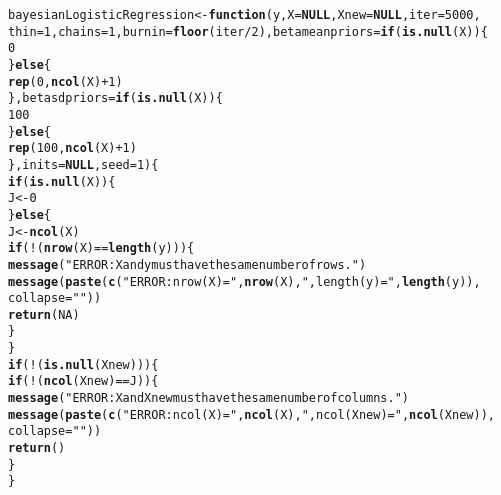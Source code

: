 \documentclass{article}\usepackage[]{graphicx}\usepackage[]{color}
\makeatletter
\newcommand{\hlnum}[1]{\textcolor[rgb]{0.686,0.059,0.569}{#1}}%
\newcommand{\hlstr}[1]{\textcolor[rgb]{0.192,0.494,0.8}{#1}}%
\newcommand{\hlopt}[1]{\textcolor[rgb]{0,0,0}{#1}}%
\newcommand{\hlstd}[1]{\textcolor[rgb]{0.345,0.345,0.345}{#1}}%
\newcommand{\hlkwa}[1]{\textcolor[rgb]{0.161,0.373,0.58}{\textbf{#1}}}%
\newcommand{\hlkwb}[1]{\textcolor[rgb]{0.69,0.353,0.396}{#1}}%
\newcommand{\hlkwc}[1]{\textcolor[rgb]{0.333,0.667,0.333}{#1}}%
\newcommand{\hlkwd}[1]{\textcolor[rgb]{0.737,0.353,0.396}{\textbf{#1}}}%
\newenvironment{kframe}{%
 \def\at@end@of@kframe{}%
 \ifinner\ifhmode%
  \def\at@end@of@kframe{\end{minipage}}%
  \begin{minipage}{\columnwidth}%
 \fi\fi%
 \def\FrameCommand##1{\hskip\@totalleftmargin \hskip-\fboxsep
 \colorbox{shadecolor}{##1}\hskip-\fboxsep
     \hskip-\linewidth \hskip-\@totalleftmargin \hskip\columnwidth}%
 \MakeFramed {\advance\hsize-\width
   \@totalleftmargin\z@ \linewidth\hsize
   \@setminipage}}%
 {\par\unskip\endMakeFramed%
 \at@end@of@kframe}
\newenvironment{knitrout}{}{} %
\makeatother
\begin{document}
\begin{knitrout}
\color{fgcolor}\begin{kframe}
\begin{alltt}
\hlstd{bayesianLogisticRegression} \hlkwb{<-} \hlkwa{function}\hlstd{(}\hlkwc{y}\hlstd{,} \hlkwc{X} \hlstd{=} \hlkwa{NULL}\hlstd{,} \hlkwc{Xnew} \hlstd{=} \hlkwa{NULL}\hlstd{,} \hlkwc{iter} \hlstd{=} \hlnum{5000}\hlstd{,}
    \hlkwc{thin} \hlstd{=} \hlnum{1}\hlstd{,} \hlkwc{chains} \hlstd{=} \hlnum{1}\hlstd{,} \hlkwc{burnin} \hlstd{=} \hlkwd{floor}\hlstd{(iter}\hlopt{/}\hlnum{2}\hlstd{),} \hlkwc{betameanpriors} \hlstd{=} \hlkwa{if} \hlstd{(}\hlkwd{is.null}\hlstd{(X)) \{}
        \hlnum{0}
    \hlstd{\}} \hlkwa{else} \hlstd{\{}
        \hlkwd{rep}\hlstd{(}\hlnum{0}\hlstd{,} \hlkwd{ncol}\hlstd{(X)} \hlopt{+} \hlnum{1}\hlstd{)}
    \hlstd{\},} \hlkwc{betasdpriors} \hlstd{=} \hlkwa{if} \hlstd{(}\hlkwd{is.null}\hlstd{(X)) \{}
        \hlnum{100}
    \hlstd{\}} \hlkwa{else} \hlstd{\{}
        \hlkwd{rep}\hlstd{(}\hlnum{100}\hlstd{,} \hlkwd{ncol}\hlstd{(X)} \hlopt{+} \hlnum{1}\hlstd{)}
    \hlstd{\},} \hlkwc{inits} \hlstd{=} \hlkwa{NULL}\hlstd{,} \hlkwc{seed} \hlstd{=} \hlnum{1}\hlstd{) \{}
    \hlkwa{if} \hlstd{(}\hlkwd{is.null}\hlstd{(X)) \{}
        \hlstd{J} \hlkwb{<-} \hlnum{0}
    \hlstd{\}} \hlkwa{else} \hlstd{\{}
        \hlstd{J} \hlkwb{<-} \hlkwd{ncol}\hlstd{(X)}
        \hlkwa{if} \hlstd{(}\hlopt{!}\hlstd{(}\hlkwd{nrow}\hlstd{(X)} \hlopt{==} \hlkwd{length}\hlstd{(y))) \{}
            \hlkwd{message}\hlstd{(}\hlstr{"ERROR: X and y must have the same number of rows."}\hlstd{)}
            \hlkwd{message}\hlstd{(}\hlkwd{paste}\hlstd{(}\hlkwd{c}\hlstd{(}\hlstr{"ERROR: nrow(X) ="}\hlstd{,} \hlkwd{nrow}\hlstd{(X),} \hlstr{", length(y) ="}\hlstd{,} \hlkwd{length}\hlstd{(y)),}
                \hlkwc{collapse} \hlstd{=} \hlstr{" "}\hlstd{))}
            \hlkwd{return}\hlstd{(}\hlnum{NA}\hlstd{)}
        \hlstd{\}}
    \hlstd{\}}
    \hlkwa{if} \hlstd{(}\hlopt{!}\hlstd{(}\hlkwd{is.null}\hlstd{(Xnew))) \{}
        \hlkwa{if} \hlstd{(}\hlopt{!}\hlstd{(}\hlkwd{ncol}\hlstd{(Xnew)} \hlopt{==} \hlstd{J)) \{}
            \hlkwd{message}\hlstd{(}\hlstr{"ERROR: X and Xnew must have the same number of columns."}\hlstd{)}
            \hlkwd{message}\hlstd{(}\hlkwd{paste}\hlstd{(}\hlkwd{c}\hlstd{(}\hlstr{"ERROR: ncol(X) ="}\hlstd{,} \hlkwd{ncol}\hlstd{(X),} \hlstr{", ncol(Xnew) ="}\hlstd{,} \hlkwd{ncol}\hlstd{(Xnew)),}
                \hlkwc{collapse} \hlstd{=} \hlstr{" "}\hlstd{))}
            \hlkwd{return}\hlstd{()}
        \hlstd{\}}
    \hlstd{\}}

\end{alltt}
\end{kframe}
\end{knitrout}
\end{document}
